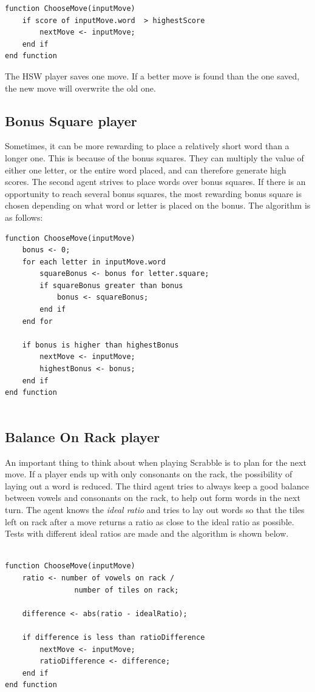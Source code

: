 \documentclass[a4paper, 12pt]{report}
\begin{document}
\begin{lstlisting}
function ChooseMove(inputMove)
	if score of inputMove.word  > highestScore
		nextMove <- inputMove;
	end if
end function
\end{lstlisting}

The HSW player saves one move. If a better move is found than the one saved, the new move will overwrite the old one.

\subsection{Bonus Square player}
Sometimes, it can be more rewarding to place a relatively short word than a longer one. This is because of the bonus squares. They can multiply the value of either one letter, or the entire word placed, and can therefore generate high scores. The second agent strives to place words over bonus squares. If there is an opportunity to reach several bonus squares, the most rewarding bonus square is chosen depending on what word or letter is placed on the bonus. The algorithm is as follows:

\begin{lstlisting}
function ChooseMove(inputMove)
	bonus <- 0;
	for each letter in inputMove.word
		squareBonus <- bonus for letter.square;
		if squareBonus greater than bonus
			bonus <- squareBonus;
		end if 
	end for
	
	if bonus is higher than highestBonus
		nextMove <- inputMove;
		highestBonus <- bonus;
	end if
end function
			
\end{lstlisting}

\subsection{Balance On Rack player}
An important thing to think about when playing Scrabble is to plan for the next move. If a player ends up with only consonants on the rack, the possibility of laying out a word is reduced. The third agent tries to always keep a good balance between vowels and consonants on the rack, to help out form words in the next turn. The agent knows the \emph{ideal ratio} and tries to lay out words so that the tiles left on rack after a move returns a ratio as close to the ideal ratio as possible. Tests with different ideal ratios are made and the algorithm is shown below.

\begin{lstlisting}

function ChooseMove(inputMove)
	ratio <- number of vowels on rack / 
				number of tiles on rack;

	difference <- abs(ratio - idealRatio);

	if difference is less than ratioDifference
		nextMove <- inputMove;
		ratioDifference <- difference;
	end if
end function
\end{lstlisting}
\end{document}
